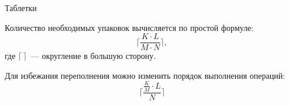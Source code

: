 \begin{tutorial}{Таблетки}

Количество необходимых упаковок вычисляется по простой формуле:
$$\lceil \frac{K \cdot L}{M \cdot N} \rceil,$$
где $\lceil \, \rceil$~--- округление в большую сторону.

Для избежания переполнения можно изменить порядок выполнения операций:
$$\lceil \frac{\frac{K}{M} \cdot L}{N} \rceil$$

\end{tutorial}
